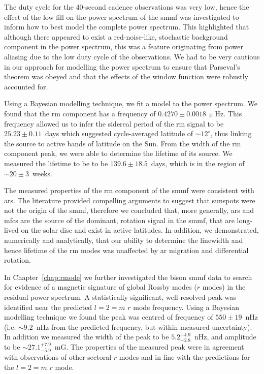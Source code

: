 The duty cycle for the 40-second cadence observations was very low, hence the effect of the low fill on the power spectrum of the \gls{smmf} was investigated to inform how to best model the complete power spectrum. This highlighted that although there appeared to exist a red-noise-like, stochastic background component in the power spectrum, this was a feature originating from power aliasing due to the low duty cycle of the observations. We had to be very cautious in our approach for modelling the power spectrum to ensure that Parseval's theorem was obeyed and that the effects of the window function were robustly accounted for.

Using a Bayesian modelling technique, we fit a model to the power spectrum. We found that the \gls{rm} component has a frequency of $0.4270\pm0.0018\,\upmu\mathrm{Hz}$. This frequency allowed us to infer the sidereal period of the \gls{rm} signal to be $25.23\pm0.11$~days which suggested cycle-averaged latitude of $\sim 12^{\circ}$, thus linking the source to active bands of latitude on the Sun. From the width of the \gls{rm} component peak, we were able to determine the lifetime of its source. We measured the lifetime to be to be $139.6\pm18.5$~days, which is in the region of $\sim20\pm3$~weeks.

The measured properties of the \gls{rm} component of the \gls{smmf} were consistent with \glspl{ar}. The literature provided compelling arguments to suggest that sunspots were not the origin of the \gls{smmf}, therefore we concluded that, more generally, \glspl{ar} and \glspl{mfc} are the source of the dominant, rotation signal in the \gls{smmf}, that are long-lived on the solar disc and exist in active latitudes. In addition, we demonstrated, numerically and analytically, that our ability to determine the linewidth and hence lifetime of the \gls{rm} modes was unaffected by \gls{ar} migration and differential rotation.


In Chapter~\ref{chap:rmode} we further investigated the \gls{bison} \gls{smmf} data to search for evidence of a magnetic signature of global Rossby modes ($r$ modes) in the residual power spectrum. A statistically significant, well-resolved peak was identified near the predicted $l=2=m$ $r$ mode frequency. Using a Bayesian modelling technique we found the peak was centred of frequency of $550\pm19$~nHz (i.e. $\sim9.2$~nHz from the predicted frequency, but within measured uncertainty). In addition we measured the width of the peak to be $5.2^{+4.9}_{-2.8}$~nHz, and amplitude to be $\sim 27.1^{+7.9}_{-5.9}$~mG. The properties of the measured peak were in agreement with observations of other sectoral $r$ modes and in-line with the predictions for the $l=2=m$ $r$ mode.

